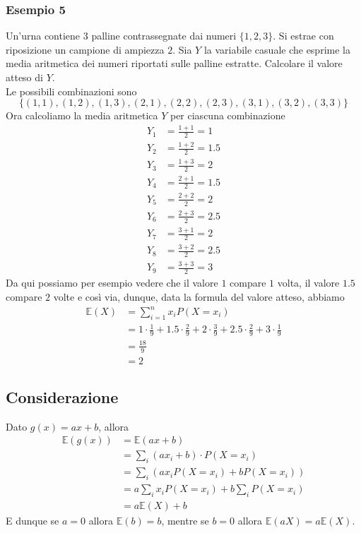 \documentclass[11pt]{report}
\begin{document}
\subsubsection{Esempio 5}
Un'urna contiene $3$ palline contrassegnate dai numeri $\{1, 2, 3\}$. Si estrae con riposizione un campione di ampiezza $2$. Sia $Y$ la variabile casuale che esprime la media aritmetica dei numeri riportati sulle palline estratte. Calcolare il valore atteso di $Y$.\\
Le possibili combinazioni sono
$$\{(1,1),(1,2),(1,3),(2,1),(2,2),(2,3),(3,1),(3,2),(3,3)\}$$
Ora calcoliamo la media aritmetica $Y$ per ciascuna combinazione
\begin{equation}
	\begin{split}
		Y_1 & = \frac{1 + 1}{2} = 1\\
		Y_2 & = \frac{1 + 2}{2} = 1.5\\
		Y_3 & = \frac{1 + 3}{2} = 2\\
		Y_4 & = \frac{2 + 1}{2} = 1.5\\
		Y_5 & = \frac{2 + 2}{2} = 2\\
		Y_6 & = \frac{2 + 3}{2} = 2.5\\
		Y_7 & = \frac{3 + 1}{2} = 2\\
		Y_8 & = \frac{3 + 2}{2} = 2.5\\
		Y_9 & = \frac{3 + 3}{2} = 3
	\end{split}
\end{equation}
Da qui possiamo per esempio vedere che il valore $1$ compare $1$ volta, il valore $1.5$ compare $2$ volte e così via, dunque, data la formula del valore atteso, abbiamo
\begin{equation}
	\begin{split}
		\mathbb{E}(X) & = \sum_{i=1}^{n}x_iP(X=x_i)\\
		& = 1 \cdot \frac{1}{9} + 1.5 \cdot \frac{2}{9} + 2 \cdot \frac{3}{9} + 2.5 \cdot \frac{2}{9} + 3 \cdot \frac{1}{9}\\
		& = \frac{18}{9}\\
		& = 2
	\end{split}
\end{equation}

\subsection{Considerazione}
Dato $g(x) = ax + b$, allora
\begin{equation}
    \begin{split}
        \mathbb{E}(g(x)) & = \mathbb{E}(ax + b)\\
        & = \sum_{i}(ax_i + b) \cdot P(X=x_i)\\
        & = \sum_{i}(ax_iP(X=x_i) + bP(X=x_i))\\
        & = a\sum_{i}x_iP(X=x_i) + b\sum_{i}P(X=x_i)\\
        & = a\mathbb{E}(X) + b
    \end{split}
\end{equation}
E dunque se $a = 0$ allora $\mathbb{E}(b) = b$, mentre se $b = 0$ allora $\mathbb{E}(aX) = a\mathbb{E}(X)$.
\end{document}
